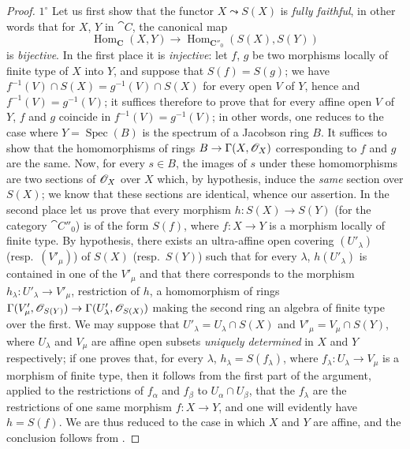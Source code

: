\begin{proof}
$1^\circ$ Let us first show that the functor $X\leadsto S(X)$ is \emph{fully faithful}, in other words that for $X$, $Y$ in $\cat{C}$, the canonical map
\[
  \operatorname{Hom}_{\mathbf{C}}(X,Y)\to\operatorname{Hom}_{\mathbf{C}''_0}(S(X),S(Y))
\]
is \emph{bijective}.
In the first place it is \emph{injective}: let $f$, $g$ be two morphisms locally of finite type of $X$ into $Y$, and suppose that $S(f)=S(g)$; we have $f^{-1}(V)\cap S(X)=g^{-1}(V)\cap S(X)$ for every open $V$ of $Y$, hence  and  $f^{-1}(V)=g^{-1}(V)$; it suffices therefore to prove that for every affine open $V$ of $Y$, $f$ and $g$ coincide in $f^{-1}(V)=g^{-1}(V)$; in other words, one reduces to the case where $Y=\operatorname{Spec}(B)$ is the spectrum of a Jacobson ring $B$.
It suffices  to show that the homomorphisms of rings $B\to\Gamma(X,\mathscr{O}_X)$ corresponding to $f$ and $g$ are the same.
Now, for every $s\in B$, the images of $s$ under these homomorphisms are two sections of $\mathscr{O}_X$ over $X$ which, by hypothesis, induce the \emph{same} section over $S(X)$; we know  that these sections are identical, whence our assertion.
In the second place let us prove that every morphism $h:S(X)\to S(Y)$ (for the category $\cat{C}''_0$) is of the form $S(f)$, where $f:X\to Y$ is a morphism locally of finite type.
By hypothesis, there exists an ultra-affine open covering $(U'_\lambda)$ (resp.\ $(V'_\mu)$) of $S(X)$ (resp.\ $S(Y)$) such that for every $\lambda$, $h(U'_\lambda)$ is contained in one of the $V'_\mu$ and that there corresponds to the morphism $h_\lambda:U'_\lambda\to V'_\mu$, restriction of $h$, a homomorphism of rings $\Gamma(V'_\mu,\mathscr{O}_{S(Y)})\to\Gamma(U'_\lambda,\mathscr{O}_{S(X)})$ making the second ring an algebra of finite type over the first.
We may suppose that $U'_\lambda=U_\lambda\cap S(X)$ and $V'_\mu=V_\mu\cap S(Y)$, where $U_\lambda$ and $V_\mu$ are affine open subsets \emph{uniquely determined} in $X$ and $Y$ respectively; if one proves that, for every $\lambda$, $h_\lambda=S(f_\lambda)$, where $f_\lambda:U_\lambda\to V_\mu$ is a morphism of finite type, then it follows from the first part of the argument, applied to the restrictions of $f_\alpha$ and $f_\beta$ to $U_\alpha\cap U_\beta$, that the $f_\lambda$ are the restrictions of one same morphism $f:X\to Y$, and one will evidently have $h=S(f)$. We are thus reduced to the case in which $X$ and $Y$ are affine, and the conclusion follows from .


\end{proof}

